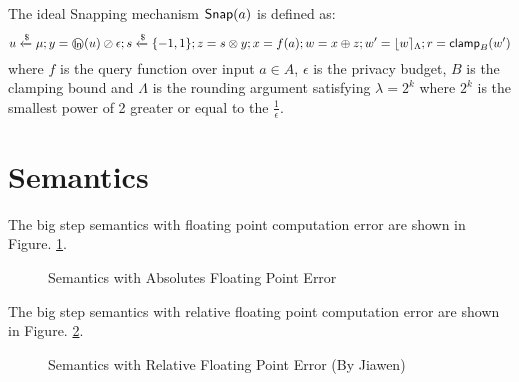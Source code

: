 \documentclass[a4paper,11pt]{article}
\begin{document}
\begin{defn}
The ideal Snapping mechanism $\mathsf{Snap}( a)$ is defined as:
\[
	u \xleftarrow{\$} \edistr; y = \oln (u) \oslash \epsilon; s \samplel \{-1, 1\}; z = s \otimes y; x = f(a); w = x \oplus z; w' = \round{w}_{\Lambda}; r = \clamp_B (w')
\]
where $f$ is the query function over input $a \in A$, $\epsilon$ is the privacy budget, $B$ is the clamping bound and $\Lambda$ is the rounding argument satisfying $\lambda = 2^k$ where $2^k$ is the smallest power of 2 greater or equal to the $\frac{1}{\epsilon}$.
\end{defn}

\section{Semantics}
The big step semantics with floating point computation error are shown in Figure. \ref{fig_semantics_abs}.
\begin{figure}
\caption{Semantics with Absolutes Floating Point Error \cite{Becker2018verified}}
\label{fig_semantics_abs}
\end{figure}

The big step semantics with relative floating point computation error are shown in Figure. \ref{fig_semantics_rel}.
\begin{figure}
\caption{Semantics with Relative Floating Point Error (By Jiawen)}
\label{fig_semantics_rel}
\end{figure}
\end{document}
